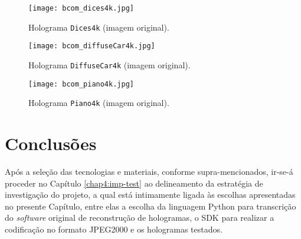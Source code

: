 \begin{figure}
    \centering
    \texttt{[image: bcom\_dices4k.jpg]}
    \caption{Holograma \texttt{Dices4k} (imagem original).}
    \label{fig:bcom_dices4k}
\end{figure}

\begin{figure}
    \centering
    \texttt{[image: bcom\_diffuseCar4k.jpg]}
    \caption{Holograma \texttt{DiffuseCar4k} (imagem original).}
    \label{fig:bcom_diffuseCar4k}
\end{figure}

\begin{figure}
    \centering
    \texttt{[image: bcom\_piano4k.jpg]}
    \caption{Holograma \texttt{Piano4k} (imagem original).}
    \label{fig:bcom_piano4k}
\end{figure}


\section{Conclusões}
\label{chap3:sec:concs}

Após a seleção das tecnologias e materiais, conforme supra-mencionados, ir-se-á proceder no Capítulo \ref{chap4:imp-test} ao delineamento da estratégia de investigação do projeto, a qual está intimamente ligada às escolhas apresentadas no presente Capítulo, entre elas a escolha da linguagem Python para transcrição do \textit{software} original de reconstrução de hologramas, o \ac{SDK} para realizar a codificação no formato JPEG2000 e os hologramas testados.


